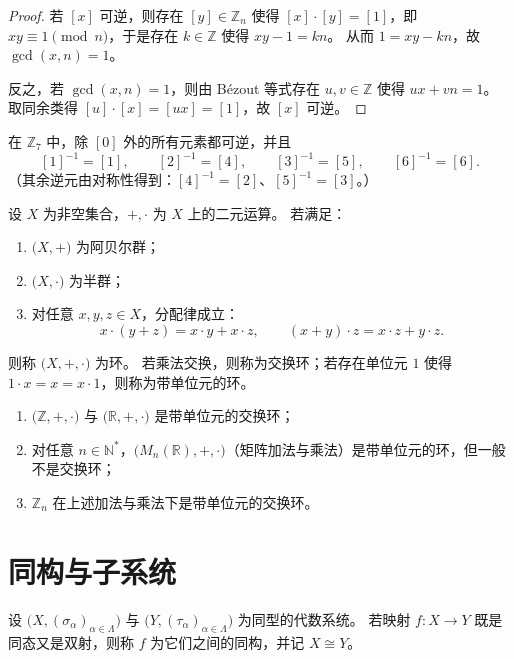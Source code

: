 \documentclass[lang=cn,a4paper,newtx]{elegantbook}
\begin{document}
\begin{proof}
若 $[x]$ 可逆，则存在 $[y]\in\mathbb Z_n$ 使得 $[x]\cdot[y]=[1]$，即 $xy\equiv 1\pmod n$，于是存在 $k\in\mathbb Z$ 使得 $xy-1=kn$。
从而 $1=xy-kn$，故 $\gcd(x,n)=1$。

反之，若 $\gcd(x,n)=1$，则由 Bézout 等式存在 $u,v\in\mathbb Z$ 使得 $ux+vn=1$。
取同余类得 $[u]\cdot[x]=[ux]=[1]$，故 $[x]$ 可逆。
\end{proof}

\begin{example}
在 $\mathbb Z_7$ 中，除 $[0]$ 外的所有元素都可逆，并且
\[
  [1]^{-1}=[1],\qquad [2]^{-1}=[4],\qquad [3]^{-1}=[5],\qquad [6]^{-1}=[6].
\]
（其余逆元由对称性得到：$[4]^{-1}=[2]$、$[5]^{-1}=[3]$。）
\end{example}

\begin{definition}[环]
设 $X$ 为非空集合，$+,\cdot$ 为 $X$ 上的二元运算。
若满足：
\begin{enumerate}
  \item $\bigl(X,+\bigr)$ 为阿贝尔群；
  \item $\bigl(X,\cdot\bigr)$ 为半群；
  \item 对任意 $x,y,z\in X$，分配律成立：
  \[
    x\cdot (y+z)=x\cdot y+x\cdot z,\qquad (x+y)\cdot z=x\cdot z+y\cdot z.
  \]
\end{enumerate}
则称 $\bigl(X,+,\cdot\bigr)$ 为环。
若乘法交换，则称为交换环；若存在单位元 $1$ 使得 $1\cdot x=x=x\cdot 1$，则称为带单位元的环。
\end{definition}

\begin{example}
\leavevmode
\begin{enumerate}
  \item $\bigl(\mathbb Z,+,\cdot\bigr)$ 与 $\bigl(\mathbb R,+,\cdot\bigr)$ 是带单位元的交换环；
  \item 对任意 $n\in\mathbb N^{*}$，$\bigl(M_n(\mathbb R),+,\cdot\bigr)$（矩阵加法与乘法）是带单位元的环，但一般不是交换环；
  \item $\mathbb Z_n$ 在上述加法与乘法下是带单位元的交换环。
\end{enumerate}
\end{example}

\section{同构与子系统}

\begin{definition}[同构]
设 $\bigl(X,(\sigma_{\alpha})_{\alpha\in\Lambda}\bigr)$ 与 $\bigl(Y,(\tau_{\alpha})_{\alpha\in\Lambda}\bigr)$ 为同型的代数系统。
若映射 $f:X\to Y$ 既是同态又是双射，则称 $f$ 为它们之间的同构，并记 $X\cong Y$。
\end{definition}
\end{document}
